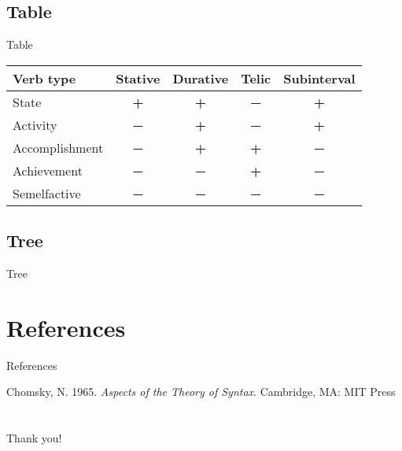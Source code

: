 \documentclass[xetex,serif,xcolor=x11names,compress]{beamer}
\newcommand\hla[1]{\textcolor{CustomRed}{#1}}
\newcommand\hlc[1]{\textcolor{CustomBlue}{#1}}
\begin{document}
\subsection{Table}
\begin{frame}{Table}
	\vfil
	\newcommand\tablep{\hlc{\Large\textbf{+}}}
	\newcommand\tablem{\hla{\Large\textbf{−}}}
	\begin{tabularx}{\linewidth}{lCCCC} \toprule
		Verb type      & Stative & Durative & Telic   & Subinterval \\ \midrule
		State          & \tablep & \tablep  & \tablem & \tablep     \\
		Activity       & \tablem & \tablep  & \tablem & \tablep     \\
		Accomplishment & \tablem & \tablep  & \tablep & \tablem     \\
		Achievement    & \tablem & \tablem  & \tablep & \tablem     \\
		Semelfactive   & \tablem & \tablem  & \tablem & \tablem     \\ \bottomrule
	\end{tabularx}
	\vfil
\end{frame}

\subsection{Tree}
\begin{frame}{Tree}
	\vfil
	\begin{center}
	\end{center}
	\vfil
\end{frame}

\section{References}
\begin{frame}{References}
	\vfil
	\begin{thebibliography}{1}
			Chomsky, N. 1965.
			\newblock \textit{Aspects of the Theory of Syntax}.
			\newblock Cambridge, MA: MIT Press
	\end{thebibliography}
	\vfil
\end{frame}

\section{}
\begin{frame}
	\vfil
	\begin{center}
		{\Huge Thank you!}
	\end{center}
	\vfil
\end{frame}
\end{document}

